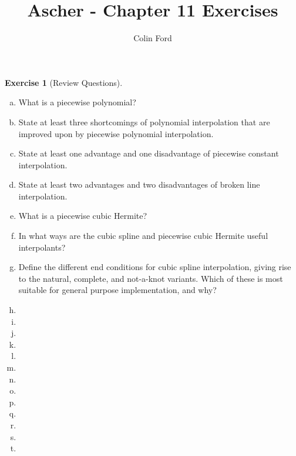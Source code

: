 \documentclass[12pt,a4]{article}
\author{Colin Ford}
\title{Ascher - Chapter 11 Exercises}
\date{}
\theoremstyle{definition}
\newtheorem{exercise}{Exercise}
\begin{document}
\maketitle

\begin{exercise}[Review Questions]
	\begin{enumerate}[(a)]
		\item What is a piecewise polynomial?
		
		\item State at least three shortcomings of polynomial interpolation that are improved upon by piecewise polynomial interpolation.
		
		\item State at least one advantage and one disadvantage of piecewise constant interpolation.
	
		\item State at least two advantages and two disadvantages of broken line interpolation.
		
		\item What is a piecewise cubic Hermite?
		
		\item In what ways are the cubic spline and piecewise cubic Hermite useful interpolants?
		
		\item Define the different end conditions for cubic spline interpolation, giving rise to the natural, complete, and not-a-knot variants. Which of these is most suitable for general purpose implementation, and why?
		
		\item 
		
		\item 
		
		\item 
		
		\item 
		
		\item 
		
		\item 
		
		\item 
		
		\item 
		
		\item 
		
		\item 
		
		\item 
		
		\item 
		
		\item 
		
	\end{enumerate}
\end{exercise}
\end{document}
